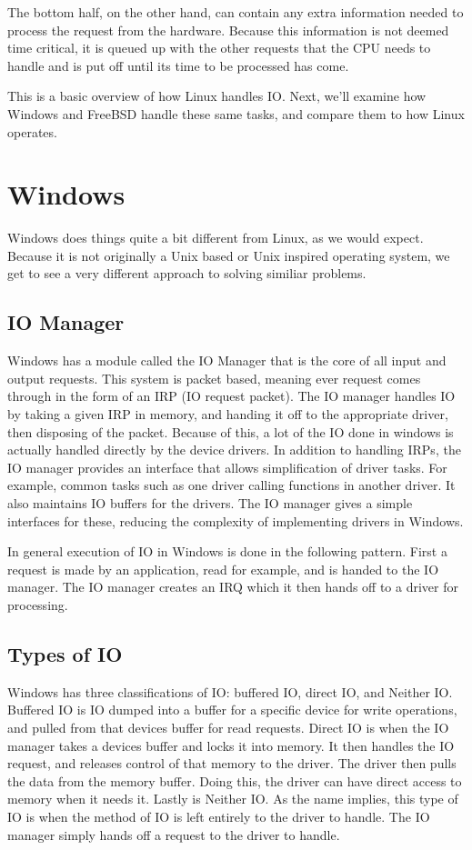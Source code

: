   The bottom half, on the other hand, can contain any extra information needed
  to process the request from the hardware. Because this information is not deemed
  time critical, it is queued up with the other requests that the CPU needs to handle
  and is put off until its time to be processed has come. \cite{robertlove2010}



  This is a basic overview of how Linux handles IO. Next, we'll examine how Windows
  and FreeBSD handle these same tasks, and compare them to how Linux operates.

\section{Windows}
Windows does things quite a bit different from Linux, as we would expect. Because
it is not originally a Unix based or Unix inspired operating system, we get to
see a very different approach to solving similiar problems.
 \subsection{IO Manager}
 Windows has a module called the IO Manager that is the core of all input and output
 requests. This system is packet based, meaning ever request comes through in the
 form of an IRP (IO request packet). The IO manager handles IO by taking a given
 IRP in memory, and handing it off to the appropriate driver, then disposing of
 the packet. Because of this, a lot of the IO done in windows is actually handled
 directly by the device drivers. In addition to handling IRPs, the IO manager
 provides an interface that allows simplification of driver tasks. For example,
 common tasks such as one driver calling functions in another driver. It also
 maintains IO buffers for the drivers. The IO manager gives a simple interfaces
 for these, reducing the complexity of implementing drivers in Windows.

 In general execution of IO in Windows is done in the following pattern. First
 a request is made by an application, read for example, and is handed to the IO
 manager. The IO manager creates an IRQ which it then hands off to a driver for
 processing.
 \cite{internals2}
 \subsection{Types of IO}
 Windows has three classifications of IO: buffered IO, direct IO, and Neither IO.
 Buffered IO is IO dumped into a buffer for a specific device for write operations,
 and pulled from that devices buffer for read requests. Direct IO is when the IO
 manager takes a devices buffer and locks it into memory. It then handles the IO
 request, and releases control of that memory to the driver. The driver then pulls
 the data from the memory buffer. Doing this, the driver can have direct access
 to memory when it needs it. Lastly is Neither IO. As the name implies, this type
 of IO is when the method of IO is left entirely to the driver to handle. The IO
 manager simply hands off a request to the driver to handle.\cite{internals2}

